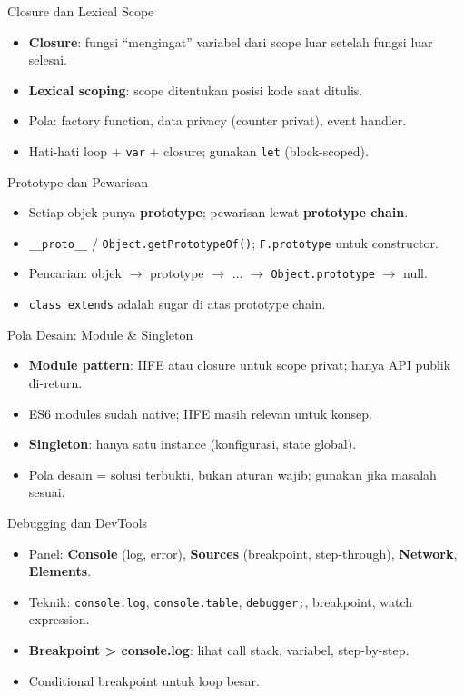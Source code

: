 \documentclass[handout]{beamer}
\begin{document}
\begin{frame}{Closure dan Lexical Scope}
	\begin{itemize}
		\item \textbf{Closure}: fungsi ``mengingat'' variabel dari scope luar setelah fungsi luar selesai.
		\item \textbf{Lexical scoping}: scope ditentukan posisi kode saat ditulis.
		\item Pola: factory function, data privacy (counter privat), event handler.
		\item Hati-hati loop + \texttt{var} + closure; gunakan \texttt{let} (block-scoped).
	\end{itemize}
\end{frame}

\begin{frame}{Prototype dan Pewarisan}
	\begin{itemize}
		\item Setiap objek punya \textbf{prototype}; pewarisan lewat \textbf{prototype chain}.
		\item \texttt{\_\_proto\_\_} / \texttt{Object.getPrototypeOf()}; \texttt{F.prototype} untuk constructor.
		\item Pencarian: objek $\to$ prototype $\to$ ... $\to$ \texttt{Object.prototype} $\to$ null.
		\item \texttt{class extends} adalah sugar di atas prototype chain.
	\end{itemize}
\end{frame}

\begin{frame}{Pola Desain: Module \& Singleton}
	\begin{itemize}
		\item \textbf{Module pattern}: IIFE atau closure untuk scope privat; hanya API publik di-return.
		\item ES6 modules sudah native; IIFE masih relevan untuk konsep.
		\item \textbf{Singleton}: hanya satu instance (konfigurasi, state global).
		\item Pola desain = solusi terbukti, bukan aturan wajib; gunakan jika masalah sesuai.
	\end{itemize}
\end{frame}

\begin{frame}{Debugging dan DevTools}
	\begin{itemize}
		\item Panel: \textbf{Console} (log, error), \textbf{Sources} (breakpoint, step-through), \textbf{Network}, \textbf{Elements}.
		\item Teknik: \texttt{console.log}, \texttt{console.table}, \texttt{debugger;}, breakpoint, watch expression.
		\item \textbf{Breakpoint > console.log}: lihat call stack, variabel, step-by-step.
		\item Conditional breakpoint untuk loop besar.
	\end{itemize}
\end{frame}
\end{document}
